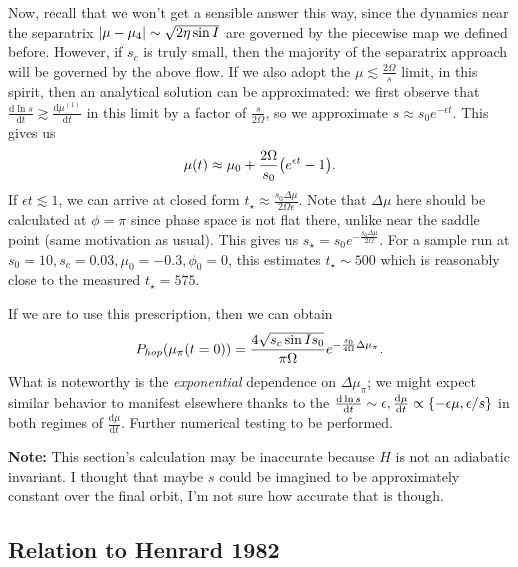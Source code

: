 \documentclass[11pt,
        usenames, %
        dvipsnames %
    ]{article}
\newcommand*{\rd}[2]{\frac{\mathrm{d}#1}{\mathrm{d}#2}}
\DeclarePairedDelimiter\abs{\lvert}{\rvert}
\DeclarePairedDelimiter\p{\lparen}{\rparen}
\DeclarePairedDelimiter\z{\lbrace}{\rbrace}
\begin{document}
Now, recall that we won't get a sensible answer this way, since the dynamics
near the separatrix $\abs*{\mu - \mu_4} \sim \sqrt{2\eta \sin I}$ are governed
by the piecewise map we defined before. However, if $s_c$ is truly small, then
the majority of the separatrix approach will be governed by the above flow. If
we also adopt the $\mu \lesssim \frac{2\Omega}{s}$ limit, in this spirit, then
an analytical solution can be approximated: we first observe that $\rd{\ln s}{t}
\gtrsim \rd{\mu^{(1)}}{t}$ in this limit by a factor of $\frac{s}{2\Omega}$, so
we approximate $s \approx s_0e^{-\epsilon t}$. This gives us
\begin{equation*}
    \mu(t) \approx \mu_0 + \frac{2\Omega}{s_0}\p*{e^{\epsilon t} - 1}.
\end{equation*}
If $\epsilon t \lesssim 1$, we can arrive at closed form $t_\star \approx
\frac{s_0 \Delta \mu}{2\Omega \epsilon}$. Note that $\Delta \mu$ here should be
calculated at $\phi = \pi$ since phase space is not flat there, unlike near the
saddle point (same motivation as usual). This gives us $s_\star = s_0
e^{-\frac{s_0 \Delta \mu}{2\Omega}}$. For a sample run at $s_0 = 10, s_c =
0.03, \mu_0 = -0.3, \phi_0 = 0$, this estimates $t_\star \sim 500$ which is
reasonably close to the measured $t_\star = 575$.

If we are to use this prescription, then we can obtain
\begin{equation}
    P_{hop}\p*{\mu_\pi(t = 0)}
        = \frac{4\sqrt{s_c \sin I s_0}}{\pi \Omega}
            e^{-\frac{s_0}{4\Omega}\Delta \mu_\pi}.
\end{equation}
What is noteworthy is the \emph{exponential} dependence on $\Delta \mu_\pi$; we
might expect similar behavior to manifest elsewhere thanks to the $\rd{\ln s}{t}
\sim \epsilon, \rd{\mu}{t} \propto \z*{-\epsilon \mu, \epsilon/s}$ in both
regimes of $\rd{\mu}{t}$. Further numerical testing to be performed.

\textbf{Note:} This section's calculation may be inaccurate because $H$ is not
an adiabatic invariant. I thought that maybe $s$ could be imagined to be
approximately constant over the final orbit, I'm not sure how accurate that is
though.

\subsection{Relation to Henrard 1982}
\end{document}
